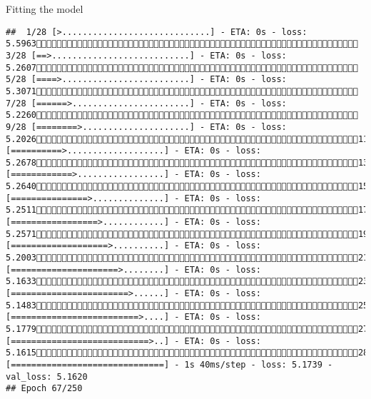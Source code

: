 \documentclass[
  ignorenonframetext,
]{beamer}
\begin{document}
\begin{frame}[fragile]{Fitting the model}
\begin{verbatim}
##  1/28 [>.............................] - ETA: 0s - loss: 5.5963 3/28 [==>...........................] - ETA: 0s - loss: 5.2607 5/28 [====>.........................] - ETA: 0s - loss: 5.3071 7/28 [======>.......................] - ETA: 0s - loss: 5.2260 9/28 [========>.....................] - ETA: 0s - loss: 5.202611/28 [==========>...................] - ETA: 0s - loss: 5.267813/28 [============>.................] - ETA: 0s - loss: 5.264015/28 [===============>..............] - ETA: 0s - loss: 5.251117/28 [=================>............] - ETA: 0s - loss: 5.257119/28 [===================>..........] - ETA: 0s - loss: 5.200321/28 [=====================>........] - ETA: 0s - loss: 5.163323/28 [=======================>......] - ETA: 0s - loss: 5.148325/28 [=========================>....] - ETA: 0s - loss: 5.177927/28 [===========================>..] - ETA: 0s - loss: 5.161528/28 [==============================] - 1s 40ms/step - loss: 5.1739 - val_loss: 5.1620
## Epoch 67/250

\end{verbatim}
\end{frame}
\end{document}
